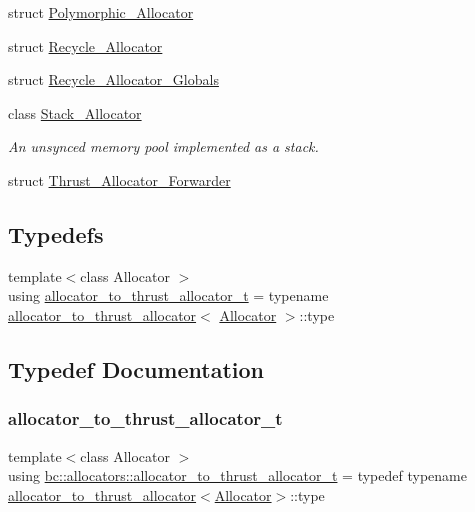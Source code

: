 \begin{DoxyCompactItemize}
\item 
struct \hyperlink{structbc_1_1allocators_1_1Polymorphic__Allocator}{Polymorphic\+\_\+\+Allocator}
\item 
struct \hyperlink{structbc_1_1allocators_1_1Recycle__Allocator}{Recycle\+\_\+\+Allocator}
\item 
struct \hyperlink{structbc_1_1allocators_1_1Recycle__Allocator__Globals}{Recycle\+\_\+\+Allocator\+\_\+\+Globals}
\item 
class \hyperlink{classbc_1_1allocators_1_1Stack__Allocator}{Stack\+\_\+\+Allocator}
\begin{DoxyCompactList}\small\item\em An unsynced memory pool implemented as a stack. \end{DoxyCompactList}\item 
struct \hyperlink{structbc_1_1allocators_1_1Thrust__Allocator__Forwarder}{Thrust\+\_\+\+Allocator\+\_\+\+Forwarder}
\end{DoxyCompactItemize}
\subsection*{Typedefs}
\begin{DoxyCompactItemize}
\item 
{\footnotesize template$<$class Allocator $>$ }\\using \hyperlink{namespacebc_1_1allocators_ab6233c0d8d9d7391c3abdbdf1fded326}{allocator\+\_\+to\+\_\+thrust\+\_\+allocator\+\_\+t} = typename \hyperlink{structbc_1_1allocators_1_1allocator__to__thrust__allocator}{allocator\+\_\+to\+\_\+thrust\+\_\+allocator}$<$ \hyperlink{classbc_1_1allocators_1_1Allocator}{Allocator} $>$\+::type
\end{DoxyCompactItemize}


\subsection{Typedef Documentation}
\mbox{\label{namespacebc_1_1allocators_ab6233c0d8d9d7391c3abdbdf1fded326}} 
\subsubsection{\texorpdfstring{allocator\+\_\+to\+\_\+thrust\+\_\+allocator\+\_\+t}{allocator\_to\_thrust\_allocator\_t}}
{\footnotesize\ttfamily template$<$class Allocator $>$ \\
using \hyperlink{namespacebc_1_1allocators_ab6233c0d8d9d7391c3abdbdf1fded326}{bc\+::allocators\+::allocator\+\_\+to\+\_\+thrust\+\_\+allocator\+\_\+t} = typedef typename \hyperlink{structbc_1_1allocators_1_1allocator__to__thrust__allocator}{allocator\+\_\+to\+\_\+thrust\+\_\+allocator}$<$\hyperlink{classbc_1_1allocators_1_1Allocator}{Allocator}$>$\+::type}

